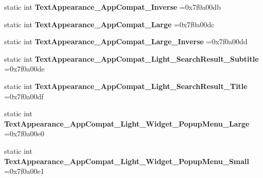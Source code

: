 \begin{DoxyCompactItemize}
\mbox{\label{classandroid_1_1support_1_1graphics_1_1drawable_1_1R_1_1style_a904f3e757e041b891ee82d1c36fd2f60}} 
static int {\bfseries Text\+Appearance\+\_\+\+App\+Compat\+\_\+\+Inverse} =0x7f0a00db
\item 
\mbox{\label{classandroid_1_1support_1_1graphics_1_1drawable_1_1R_1_1style_aa56a781bd2ded844402dbe4eff6e00dc}} 
static int {\bfseries Text\+Appearance\+\_\+\+App\+Compat\+\_\+\+Large} =0x7f0a00dc
\item 
\mbox{\label{classandroid_1_1support_1_1graphics_1_1drawable_1_1R_1_1style_a75180aeba8a91cf1b4946c9f07322278}} 
static int {\bfseries Text\+Appearance\+\_\+\+App\+Compat\+\_\+\+Large\+\_\+\+Inverse} =0x7f0a00dd
\item 
\mbox{\label{classandroid_1_1support_1_1graphics_1_1drawable_1_1R_1_1style_ad5440ad78b90542663694c8dde5b1b59}} 
static int {\bfseries Text\+Appearance\+\_\+\+App\+Compat\+\_\+\+Light\+\_\+\+Search\+Result\+\_\+\+Subtitle} =0x7f0a00de
\item 
\mbox{\label{classandroid_1_1support_1_1graphics_1_1drawable_1_1R_1_1style_a71427c9f2050d1b5ba79f3f3ee087488}} 
static int {\bfseries Text\+Appearance\+\_\+\+App\+Compat\+\_\+\+Light\+\_\+\+Search\+Result\+\_\+\+Title} =0x7f0a00df
\item 
\mbox{\label{classandroid_1_1support_1_1graphics_1_1drawable_1_1R_1_1style_a05a8394b86644e828ea47947a3190e1e}} 
static int {\bfseries Text\+Appearance\+\_\+\+App\+Compat\+\_\+\+Light\+\_\+\+Widget\+\_\+\+Popup\+Menu\+\_\+\+Large} =0x7f0a00e0
\item 
\mbox{\label{classandroid_1_1support_1_1graphics_1_1drawable_1_1R_1_1style_a4c42bfce5bcf60a46c0104296929a95f}} 
static int {\bfseries Text\+Appearance\+\_\+\+App\+Compat\+\_\+\+Light\+\_\+\+Widget\+\_\+\+Popup\+Menu\+\_\+\+Small} =0x7f0a00e1
\item 

\end{DoxyCompactItemize}
